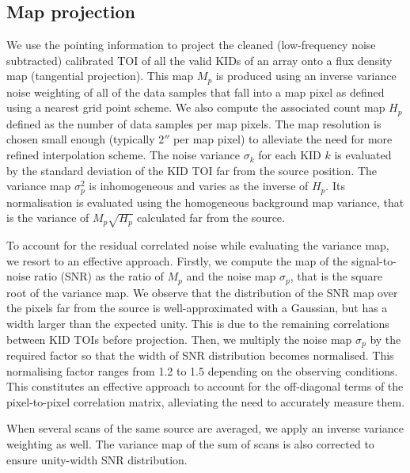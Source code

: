 \documentclass[traditionalabstract]{aa}
\newcommand{\lp}[1]{#1}
\newcommand{\LEt}[1]{{\bf {\color[RGB]{0, 153, 255} #1}}}
\begin{document}
{\subsection{Map projection}
\label{se:map_projection}
We use the pointing information to project the cleaned (low-frequency
noise subtracted) calibrated TOI of all the valid KIDs of an array
onto a flux density map (tangential projection). This map $M_p$ is produced using an inverse
variance noise weighting of all of the data samples that fall into a map
pixel as defined using a nearest grid point scheme. We also compute
the associated count map $H_p$ defined as the number of data samples
per map pixels. The map resolution
is chosen small enough (typically $2''$ per map pixel) to alleviate
the need for more refined interpolation scheme. The noise variance
$\sigma_k$ for each KID $k$ is evaluated by the standard deviation of the
KID TOI far from the source position. 
{\lp The variance map $\sigma_p^2$ is inhomogeneous and varies as the
inverse of $H_p$. Its normalisation is evaluated using the
homogeneous background map variance, that is the
variance of $M_p\sqrt{H_p}$ calculated far from the source.}

{\lp To account for the residual
correlated noise while evaluating the variance map, we resort to an
effective approach.
Firstly, we compute the map of the signal-to-noise ratio (SNR) as the ratio of
$M_p$ and the noise map $\sigma_p$, that is the square root of the
variance map. We observe that the distribution of the SNR map over the pixels far from the source is
well-approximated with a Gaussian, but has a width larger than the
expected unity. This is due to the remaining correlations between KID TOIs
before projection. Then, we multiply the noise map 
$\sigma_p$ by the required factor so
that the width of SNR distribution becomes normalised.
This normalising factor ranges from 1.2 to 1.5 depending on the observing conditions. This
constitutes an effective approach to account for the off-diagonal terms of the pixel-to-pixel
correlation matrix, alleviating the need to
accurately measure them.}%

When several scans of the same source are averaged, we apply an inverse
variance weighting as well. 
The variance map of the sum of scans is also corrected to ensure unity-width
SNR distribution.

}
\end{document}
